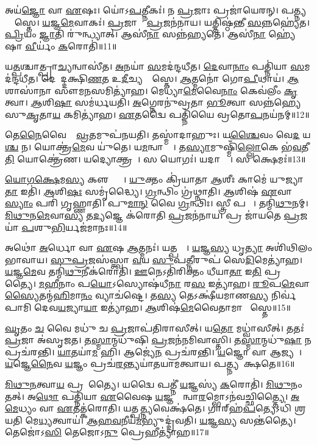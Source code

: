 𑌅𑌯॑\ul{𑌜𑍍𑌞𑍋} 𑌵𑌾 \ul{𑌏}𑌷𑌃।
𑌯𑍋॑𑌽\ul{𑌪}𑌤𑍍𑌨𑍀𑌕𑌃॑।
𑌨 \ul{𑌪𑍍𑌰}𑌜𑌾𑌃 𑌪𑍍𑌰𑌜𑌾॑𑌯𑍇𑌰𑌨𑍍।
𑌪𑌤𑍍𑌨𑍍𑌯𑌨𑍍𑌵𑌾᳚𑌸𑍍𑌤𑍇।
\ul{𑌯}𑌜𑍍𑌞\ul{𑌮𑍇}𑌵𑌾𑌕𑌃॑।
\ul{𑌪𑍍𑌰}𑌜𑌾𑌨𑌾𑌂᳚ \ul{𑌪𑍍𑌰}𑌜𑌨॑𑌨𑌾𑌯।
𑌯𑌤𑍍𑌤𑌿𑌷𑍍𑌠॑𑌨𑍍𑌤𑍀 \ul{𑌸}𑌨𑍍𑌨𑌹𑍍𑌯𑍇॑𑌤।
\ul{𑌪𑍍𑌰𑌿}𑌯𑌂 \ul{𑌜𑍍𑌞𑌾}𑌤𑌿 𑌰𑍁॑𑌨𑍍𑌧𑍍𑌯𑌾𑌤𑍍।
𑌆𑌸𑍀॑\ul{𑌨𑌾} 𑌸𑌨𑍍𑌨॑𑌹𑍍𑌯𑌤𑍇।
𑌆𑌸𑍀॑\ul{𑌨𑌾} 𑌹𑍍𑌯𑍇॑𑌷𑌾 \ul{𑌵𑍀}𑌰𑍍𑌯𑌂॑ \ul{𑌕}𑌰𑍋𑌤𑌿॑॥11॥

𑌯\ul{𑌤𑍍𑌪}𑌶𑍍𑌚𑌾𑌤𑍍𑌪𑍍𑌰𑌾\ul{𑌚𑍍𑌯}𑌨𑍍𑌵𑌾𑌸𑍀॑𑌤।
\ul{𑌅}𑌨𑌯𑌾॑ \ul{𑌸}𑌮𑌦॑𑌨𑍍𑌦𑌧𑍀𑌤।
\ul{𑌦𑍇}𑌵𑌾\ul{𑌨𑌾𑌂} 𑌪𑌤𑍍𑌨𑌿॑𑌯𑌾 \ul{𑌸}𑌮𑌦॑𑌨𑍍𑌦𑌧𑍀𑌤।
𑌦𑍇𑌶𑌾᳚𑌦𑍍𑌦𑌕𑍍𑌷𑌿\ul{𑌣}𑌤 𑌉\ul{𑌦𑍀}𑌚𑍍𑌯𑌨𑍍𑌵𑌾᳚𑌸𑍍𑌤𑍇।
\ul{𑌆}𑌤𑍍𑌮𑌨𑍋॑ 𑌗𑍋\ul{𑌪𑍀}𑌥𑌾𑌯॑।
\ul{𑌆}𑌶𑌾𑌸𑌾॑𑌨𑌾 𑌸𑍗𑌮\ul{𑌨}𑌸𑌮𑌿𑌤𑍍𑌯𑌾॑𑌹।
𑌮𑍇𑌧𑍍𑌯𑌾॑\ul{𑌮𑍇}𑌵𑍈\ul{𑌨𑌾𑌂} 𑌕𑍇𑌵॑𑌲𑍀𑌂 \ul{𑌕𑍃}𑌤𑍍𑌵𑌾।
\ul{𑌆}𑌶𑌿\ul{𑌷𑌾} 𑌸𑌮॑𑌰𑍍𑌧𑌯𑌤𑌿।
\ul{𑌅}𑌗𑍍𑌨𑍇𑌰𑌨𑍁॑𑌵𑍍𑌰𑌤𑌾 \ul{𑌭𑍂}𑌤𑍍𑌵𑌾 𑌸𑌨𑍍𑌨॑𑌹𑍍𑌯𑍇 𑌸𑍁\ul{𑌕𑍃}𑌤𑌾\ul{𑌯} 𑌕𑌮𑌿𑌤𑍍𑌯𑌾॑𑌹।
\ul{𑌏}𑌤𑌦𑍍𑌵𑍈 𑌪𑌤𑍍𑌨𑌿॑𑌯𑍈 𑌵𑍍𑌰𑌤𑍋\ul{𑌪}𑌨𑌯॑𑌨𑌮𑍍॥12॥

𑌤𑍇\ul{𑌨𑍈}𑌵𑍈𑌨𑌾𑌂᳚ \ul{𑌵𑍍𑌰}𑌤𑌮𑍁𑌪॑𑌨𑌯𑌤𑌿।
𑌤𑌸𑍍𑌮𑌾॑𑌦𑌾𑌹𑍁𑌃।
𑌯\ul{𑌶𑍍𑌚𑍈}𑌵𑌂 𑌵𑍇\ul{𑌦} 𑌯\ul{𑌶𑍍𑌚} 𑌨।
𑌯𑍋𑌕𑍍𑌤𑍍𑌰॑\ul{𑌮𑍇}𑌵 𑌯𑍁॑𑌤𑍇।
𑌯\ul{𑌮}𑌨𑍍𑌵𑌾𑌸𑍍𑌤𑍇᳚।
𑌤\ul{𑌸𑍍𑌯𑌾}𑌮𑍁𑌷𑍍𑌮𑌿𑌁॑\ul{𑌲𑍍𑌲𑍋}𑌕𑍇 𑌭॑\ul{𑌵}𑌤𑍀\ul{𑌤𑌿} 𑌯𑍋𑌕𑍍𑌤𑍍𑌰𑍇॑𑌣।
𑌯𑌦𑍍𑌯𑍋𑌕𑍍𑌤𑍍𑌰𑌮𑍍᳚।
𑌸 𑌯𑍋𑌗𑌃॑।
𑌯𑌦𑌾𑌸𑍍𑌤𑍇᳚।
𑌸 𑌕𑍍𑌷𑍇𑌮𑌃॑॥13॥

\ul{𑌯𑍋}\ul{𑌗}\ul{𑌕𑍍𑌷𑍇}𑌮\ul{𑌸𑍍𑌯} 𑌕𑍢𑌪𑍍𑌤𑍍𑌯𑍈᳚।
\ul{𑌯𑍁}𑌕𑍍𑌤𑌂 𑌕𑍍𑌰𑌿॑𑌯𑌾𑌤𑌾 \ul{𑌆}𑌶𑍀𑌃 𑌕𑌾𑌮𑍇॑ 𑌯𑍁𑌜𑍍𑌯𑌾\ul{𑌤𑌾} 𑌇𑌤𑌿॑।
\ul{𑌆}𑌶𑌿\ul{𑌷𑌃} 𑌸𑌮𑍃॑𑌦𑍍𑌧𑍍𑌯𑍈।
\ul{𑌗𑍍𑌰}𑌨𑍍𑌥𑌿𑌂 𑌗𑍍𑌰॑𑌥𑍍𑌨𑌾𑌤𑌿।
\ul{𑌆}𑌶𑌿𑌷॑ \ul{𑌏}𑌵𑌾\ul{𑌸𑍍𑌯𑌾𑌂} 𑌪𑌰𑌿॑ 𑌗𑍃𑌹𑍍𑌣𑌾𑌤𑌿।
𑌪𑍁\ul{𑌮𑌾}\ul{𑌨𑍍} 𑌵𑍈 \ul{𑌗𑍍𑌰}𑌨𑍍𑌥𑌿𑌃।
𑌸𑍍𑌤𑍍𑌰𑍀 𑌪𑌤𑍍𑌨𑍀᳚।
𑌤𑌨𑍍𑌮𑌿॑\ul{𑌥𑍁}𑌨𑌮𑍍।
\ul{𑌮𑌿}\ul{𑌥𑍁}𑌨\ul{𑌮𑍇}𑌵𑌾\ul{𑌸𑍍𑌯} 𑌤\ul{𑌦𑍍𑌯}𑌜𑍍𑌞𑍇 𑌕॑𑌰𑍋𑌤𑌿 \ul{𑌪𑍍𑌰}𑌜𑌨॑𑌨𑌾𑌯।
𑌪𑍍𑌰 𑌜𑌾॑𑌯𑌤𑍇 \ul{𑌪𑍍𑌰}𑌜𑌯𑌾॑ \ul{𑌪}𑌶𑍁\ul{𑌭𑌿}𑌰𑍍𑌯𑌜॑𑌮𑌾𑌨𑌃॥14॥

𑌅𑌥𑍋॑ \ul{𑌅}𑌰𑍍𑌧𑍋 𑌵𑌾 \ul{𑌏}𑌷 \ul{𑌆}𑌤𑍍𑌮𑌨𑌃॑।
𑌯𑌤𑍍𑌪𑌤𑍍𑌨𑍀᳚।
\ul{𑌯}𑌜𑍍𑌞\ul{𑌸𑍍𑌯} 𑌧𑍃\ul{𑌤𑍍𑌯𑌾} 𑌅𑌶𑌿॑𑌥𑌿𑌲𑌂 𑌭𑌾𑌵𑌾𑌯।
\ul{𑌸𑍁}\ul{𑌪𑍍𑌰}𑌜𑌸॑𑌸𑍍𑌤𑍍𑌵𑌾 \ul{𑌵}𑌯 \ul{𑌸𑍁}𑌪\ul{𑌤𑍍𑌨𑍀}𑌰𑍁𑌪॑ 𑌸𑍇\ul{𑌦𑌿}𑌮𑍇𑌤𑍍𑌯𑌾॑𑌹।
\ul{𑌯}𑌜𑍍𑌞\ul{𑌮𑍇}𑌵 𑌤𑌨𑍍𑌮𑌿॑\ul{𑌥𑍁}𑌨𑍀𑌕॑𑌰𑍋𑌤𑌿।
\ul{𑌊}𑌨𑍇𑌽𑌤𑌿॑𑌰𑌿𑌕𑍍𑌤𑌂 𑌧𑍀𑌯𑌾\ul{𑌤𑌾} 𑌇\ul{𑌤𑌿} 𑌪𑍍𑌰𑌜𑌾᳚𑌤𑍍𑌯𑍈।
\ul{𑌮}\ul{𑌹𑍀}𑌨𑌾𑌂 𑌪\ul{𑌯𑍋}\-𑌽𑌸𑍍𑌯𑍋𑌷॑𑌧𑍀\ul{𑌨𑌾}\ul{} 𑌰\ul{𑌸} 𑌇𑌤𑍍𑌯𑌾॑𑌹।
\ul{𑌰𑍂}𑌪\ul{𑌮𑍇}𑌵𑌾\ul{𑌸𑍍𑌯𑍈}𑌤𑌨𑍍𑌮॑\ul{𑌹𑌿}𑌮𑌾\ul{𑌨𑌂} 𑌵𑍍𑌯𑌾𑌚॑𑌷𑍍𑌟𑍇।
𑌤\ul{𑌸𑍍𑌯} 𑌤𑍇𑌽𑌕𑍍𑌷𑍀॑𑌯𑌮𑌾𑌣\ul{𑌸𑍍𑌯} 𑌨𑌿𑌰𑍍𑌵॑𑌪𑌾𑌮𑌿 𑌦𑍇𑌵\ul{𑌯}𑌜𑍍𑌯𑌾\ul{𑌯𑌾} 𑌇𑌤𑍍𑌯𑌾॑𑌹।
\ul{𑌆}𑌶𑌿𑌷॑\ul{𑌮𑍇}𑌵𑍈𑌤𑌾𑌮𑌾 𑌶𑌾᳚𑌸𑍍𑌤𑍇॥15॥\anuvakamend[\ul{𑌕}𑌰𑍋𑌤𑌿॑ 𑌵𑍍𑌰𑌤𑍋\ul{𑌪}𑌨𑌯॑\ul{𑌨𑌂} 𑌕𑍍𑌷𑍇\ul{𑌮𑍋} 𑌯𑌜॑𑌮𑌾𑌨𑌃 𑌶𑌾𑌸𑍍𑌤𑍇]

\ul{𑌘𑍃}𑌤𑌂 \ul{𑌚} 𑌵𑍈 𑌮𑌧𑍁॑ 𑌚 \ul{𑌪𑍍𑌰}𑌜𑌾𑌪॑𑌤𑌿𑌰𑌾𑌸𑍀𑌤𑍍।
𑌯\ul{𑌤𑍋} 𑌮𑌧𑍍𑌵𑌾॑𑌸𑍀𑌤𑍍।
𑌤𑌤𑌃॑ \ul{𑌪𑍍𑌰}𑌜𑌾 𑌅॑𑌸𑍃𑌜𑌤।
𑌤\ul{𑌸𑍍𑌮𑌾}𑌨𑍍𑌮𑌧𑍁॑𑌷𑌿 \ul{𑌪𑍍𑌰}𑌜𑌨॑𑌨𑌮𑌿𑌵𑌾𑌸𑍍𑌤𑌿।
𑌤\ul{𑌸𑍍𑌮𑌾}𑌨𑍍𑌮𑌧𑍁॑\ul{𑌷𑌾} 𑌨 𑌪𑍍𑌰𑌚॑𑌰𑌨𑍍𑌤𑌿।
\ul{𑌯𑌾}𑌤𑌯𑌾॑\ul{𑌮} 𑌹𑌿।
𑌆𑌜𑍍𑌯𑍇॑\ul{𑌨} 𑌪𑍍𑌰𑌚॑𑌰𑌨𑍍𑌤𑌿।
\ul{𑌯}𑌜𑍍𑌞𑍋 𑌵𑌾 𑌆𑌜𑍍𑌯𑌮𑍍᳚।
\ul{𑌯}𑌜𑍍𑌞𑍇\ul{𑌨𑍈}𑌵 \ul{𑌯}𑌜𑍍𑌞𑌂 𑌪𑍍𑌰𑌚॑\ul{𑌰}𑌨𑍍𑌤𑍍𑌯𑌯𑌾॑𑌤𑌯𑌾𑌮𑌤𑍍𑌵𑌾𑌯।
𑌪𑌤𑍍𑌨𑍍𑌯𑌵𑍇᳚𑌕𑍍𑌷𑌤𑍇॥16॥

\ul{𑌮𑌿}\ul{𑌥𑍁}\ul{𑌨}𑌤𑍍𑌵𑌾\ul{𑌯} 𑌪𑍍𑌰𑌜𑌾᳚𑌤𑍍𑌯𑍈।
𑌯𑌦𑍍𑌵𑍈 𑌪𑌤𑍍𑌨𑍀॑ \ul{𑌯}𑌜𑍍𑌞𑌸𑍍𑌯॑ \ul{𑌕}𑌰𑍋𑌤𑌿॑।
\ul{𑌮𑌿}\ul{𑌥𑍁}𑌨𑌂 𑌤𑌤𑍍।
𑌅\ul{𑌥𑍋} 𑌪𑌤𑍍𑌨𑌿॑𑌯𑌾 \ul{𑌏}𑌵𑍈𑌷 \ul{𑌯}𑌜𑍍𑌞𑌸𑍍𑌯𑌾᳚𑌨𑍍𑌵𑌾\ul{𑌰}𑌮𑍍𑌭𑍋\-𑌽𑌨॑𑌵𑌚𑍍𑌛𑌿𑌤𑍍𑌤𑍍𑌯𑍈।
\ul{𑌅}\ul{𑌮𑍇}𑌧𑍍𑌯𑌂 𑌵𑌾 \ul{𑌏}𑌤𑌤𑍍𑌕॑𑌰𑍋𑌤𑌿।
𑌯𑌤𑍍𑌪\ul{𑌤𑍍𑌨𑍍𑌯}𑌵𑍇𑌕𑍍𑌷॑𑌤𑍇।
𑌗𑌾𑌰𑍍‌\mbox{}𑌹॑\ul{𑌪}𑌤𑍍𑌯𑍇𑌽𑌧𑌿॑ 𑌶𑍍𑌰𑌯𑌤𑌿 𑌮𑍇\ul{𑌧𑍍𑌯}𑌤𑍍𑌵𑌾𑌯॑।
\ul{𑌆}\ul{𑌹}\ul{𑌵}𑌨𑍀𑌯॑\ul{𑌮}𑌭𑍍𑌯𑍁𑌦𑍍𑌦𑍍𑌰॑𑌵𑌤𑌿।
\ul{𑌯}𑌜𑍍𑌞\ul{𑌸𑍍𑌯} 𑌸𑌨𑍍𑌤॑𑌤𑍍𑌯𑍈।
𑌤𑍇𑌜𑍋॑𑌽\ul{𑌸𑌿} 𑌤𑍇𑌜𑍋𑌽\ul{𑌨𑍁} 𑌪𑍍𑌰𑍇𑌹𑍀𑌤𑍍𑌯𑌾॑𑌹॥17॥

